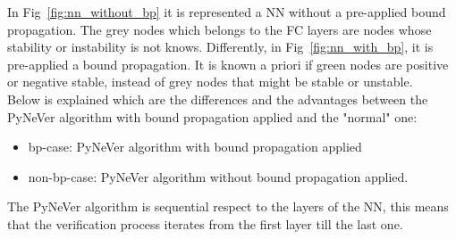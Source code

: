 
In Fig~\ref{fig:nn_without_bp} it is represented a NN without a pre-applied bound propagation. The grey nodes which belongs to the FC layers are nodes whose stability or instability is not knows. Differently, in Fig~\ref{fig:nn_with_bp}, it is pre-applied a bound propagation. It is known a priori if green nodes are positive or negative stable, instead of grey nodes that might be stable or unstable.\\
Below is explained which are the differences and the advantages between the PyNeVer algorithm with bound propagation applied and the "normal" one:
\begin{itemize}
	\item bp-case: PyNeVer algorithm with bound propagation applied
	\item non-bp-case: PyNeVer algorithm without bound propagation applied. 
\end{itemize} 
The PyNeVer algorithm is sequential respect to the layers of the NN, this means that the verification process iterates from the first layer till the last one.
